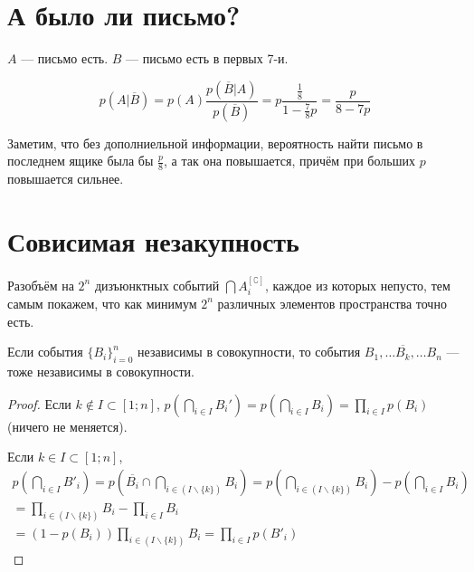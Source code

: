\documentclass[12pt, a4paper]{article}
\begin{document}
\section{А было ли письмо?}

$A$ — письмо есть. $B$ — письмо есть в первых 7-и.



\begin{equation}
    p(A | \overline{B}) = p(A) \frac{p(\overline{B} | A)}{p(\overline{B})} = p \frac{\frac{1}{8}}{1 - \frac{7}{8}p} = \frac{p}{8 - 7p}
\end{equation}


Заметим, что без дополниельной информации, вероятность найти письмо в последнем ящике была бы $\frac{p}{8}$, а так она повышается,
причём при больших $p$ повышается сильнее.


\section{Совисимая незакупность}

Разобъём на $2^n$ дизъюнктных событий $\bigcap A_i^{[\complement]}$,
каждое из которых непусто, тем самым покажем,
что как минимум $2^n$ различных элементов пространства точно есть.

\begin{lemma}
    Если события $\{B_i\}^n_{i = 0}$ независимы в совокупности,
    то события $B_1, … \overline{B_k}, … B_n$ — тоже независимы в совокупности.
\end{lemma}

\begin{proof}
    Если $k \notin I \subset [1; n]$, $p\left(\bigcap_{i \in I} B_i'\right) = p\left(\bigcap_{i \in I} B_i\right) = \prod_{i \in I} p(B_i)$ (ничего не меняется).

    Если $k \in I \subset [1; n]$,
    \begin{multline}
        p\left(\bigcap_{i \in I} B'_i\right)
        = p\left(\overline{B_i} \cap \bigcap_{i \in (I \backslash \{k\})} B_i\right)
        = p\left(\bigcap_{i \in (I \backslash \{k\})} B_i\right) - p\left(\bigcap_{i \in I} B_i\right) \\
        = \prod_{i \in (I \backslash \{k\})} B_i - \prod_{i \in I} B_i \\
        = (1 - p(B_i)) \prod_{i \in (I \backslash \{k\})} B_i
        = \prod_{i \in I} p(B'_i)
    \end{multline}
\end{proof}
\end{document}
